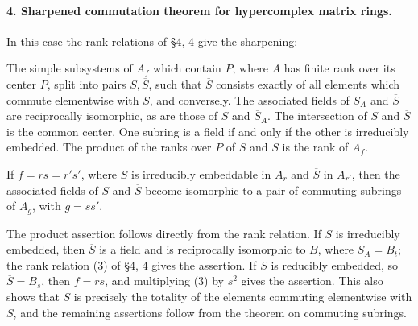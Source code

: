\documentclass[11pt]{article}
\begin{document}
\paragraph{4. Sharpened commutation theorem for hypercomplex matrix rings.}
In this case the rank relations of §4, 4 give the sharpening:

The simple subsystems of \(A_f\) which contain \(P\), where \(A\) has finite rank over its center \(P\), split into pairs \(S,\overline S\), such that \(\overline S\) consists exactly of all elements which commute elementwise with \(S\), and conversely. The associated fields of \(S_A\) and \(\overline S\) are reciprocally isomorphic, as are those of \(S\) and \(\overline S_A\). The intersection of \(S\) and \(\overline S\) is the common center. One subring is a field if and only if the other is irreducibly embedded. The product of the ranks over \(P\) of \(S\) and \(\overline S\) is the rank of \(A_f\).

If \(f=rs=r's'\), where \(S\) is irreducibly embeddable in \(A_r\) and \(\overline S\) in \(A_{r'}\), then the associated fields of \(S\) and \(\overline S\) become isomorphic to a pair of commuting subrings of \(A_g\), with \(g=ss'\).

The product assertion follows directly from the rank relation. If \(S\) is irreducibly embedded, then \(\overline S\) is a field and is reciprocally isomorphic to \(B\), where \(S_A=B_t\); the rank relation (3) of §4, 4 gives the assertion. If \(S\) is reducibly embedded, so \(\overline S=B_s\), then \(f=rs\), and multiplying (3) by \(s^2\) gives the assertion. This also shows that \(\overline S\) is precisely the totality of the elements commuting elementwise with \(S\), and the remaining assertions follow from the theorem on commuting subrings.
\end{document}
